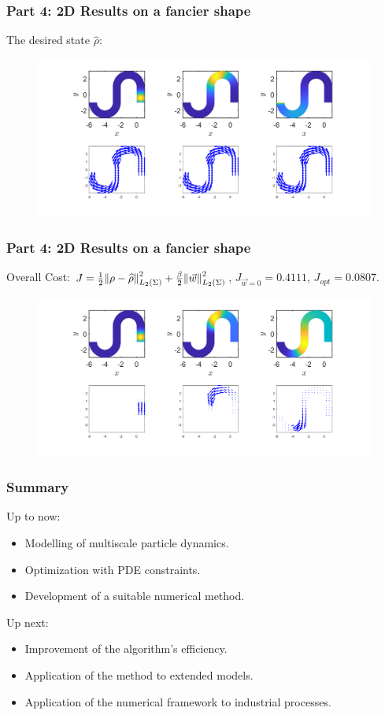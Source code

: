 \documentclass[aspectratio=169,xcolor=dvipsnames]{beamer}
\begin{document}
\begin{frame}
	\frametitle{Part 4: 2D Results on a fancier shape}
	\vspace{0.3cm}
The desired state $\widehat \rho$:
	\begin{figure}
		\includegraphics[width=14cm]{FW2n1.png}
	\end{figure}
\end{frame}
\begin{frame}
	\frametitle{Part 4: 2D Results on a fancier shape}
	\vspace{0.3cm}
	Overall Cost: $J = \frac{1}{2}\norm{\rho- \widehat{\rho}}_{L_2(\Sigma)}^2 + \frac{\beta}{2} \norm{\vec{w}}_{L_2(\Sigma)}^2$, $J_{\vec{w}=0} = 0.4111$, $J_{opt} = 0.0807$.
	\begin{figure}
		\includegraphics[width=14cm]{Opt2n1.png}
	\end{figure}
\end{frame}
\begin{frame}
	\frametitle{Summary}
Up to now:
 \begin{itemize}
 	\item Modelling of multiscale particle dynamics.
 	\item Optimization with PDE constraints.
 	\item Development of a suitable numerical method.
 \end{itemize}
Up next:
\begin{itemize}
	\item Improvement of the algorithm's efficiency.
	\item Application of the method to extended models.
 	\item Application of the numerical framework to industrial processes.
 \end{itemize}
	
\end{frame}
\end{document}
